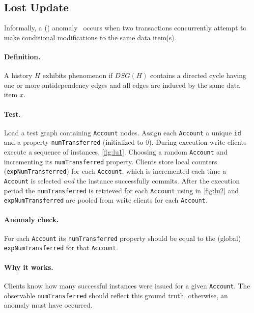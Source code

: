 \subsection{Lost Update}
\label{sec:lost-update}

Informally, a  () 
anomaly~\cite{DBLP:journals/tods/BailisFGHS16} occurs when two transactions 
concurrently attempt to make conditional modifications to the same data item(s).

\paragraph{Definition.}
A history $H$ exhibits phenomenon  if $\textit{DSG}(H)$ contains a 
directed cycle having one or more antidependency edges and all edges are induced
by the same data item $x$.

\paragraph{Test.}
Load a test graph containing \texttt{Account} nodes. Assign each \texttt{Account} 
a unique \texttt{id} and a property \texttt{numTransferred} (initialized to 0).
During execution write clients execute a sequence of  
instances, \autoref{fig:lu1}. Choosing a random \texttt{Account} and incrementing 
its \texttt{numTransferred} property. Clients store local counters 
(\texttt{expNumTransferred}) for each \texttt{Account}, which is incremented 
each time a \texttt{Account} is selected \emph{and} the  
instance successfully commits. After the execution period the 
\texttt{numTransferred} is retrieved for each \texttt{Account} using 
 in \autoref{fig:lu2} and \texttt{expNumTransferred} are 
pooled from write clients for each \texttt{Account}.

\paragraph{Anomaly check.}
For each \texttt{Account} its \texttt{numTransferred} property should be equal 
to the (global) \texttt{expNumTransferred} for that \texttt{Account}.

\paragraph{Why it works.}
Clients know how many successful  instances were issued 
for a given \texttt{Account}. The observable \texttt{numTransferred} should 
reflect this ground truth, otherwise, an  anomaly must have occurred.

